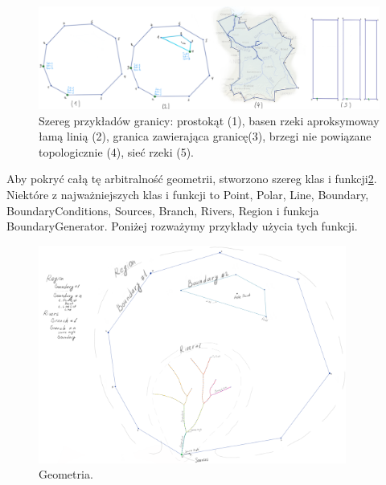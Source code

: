 \documentclass[]{pracamgr}
\begin{document}
      \begin{figure}[H]
        \centering
        \includegraphics[width=1\textwidth]{figs/geometry_examples.png}
        \caption {Szereg przykładów granicy:  prostokąt (1),  basen rzeki aproksymoway łamą linią (2), granica zawierająca granicę(3), brzegi nie powiązane topologicznie (4), sieć rzeki (5).}
        \label{geometry_examples}
      \end{figure}
      
      Aby pokryć całą tę arbitralność geometrii, stworzono szereg klas i funkcji\ref{GeometryClasses}. Niektóre z najważniejszych klas i funkcji to Point, Polar, Line, Boundary, BoundaryConditions, Sources, Branch, Rivers, Region i funkcja BoundaryGenerator. Poniżej rozważymy przykłady użycia tych funkcji.
      
      \begin{figure}[H]
        \centering
        \includegraphics[width=0.9\textwidth]{figs/GeometryClasses.png}
        \caption {Geometria.}
        \label{GeometryClasses}
      \end{figure}
\end{document}
